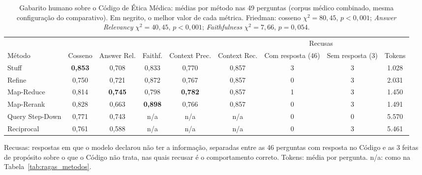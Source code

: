 \begin{table}[!t]
\centering
\footnotesize
\setlength{\tabcolsep}{4pt}
\caption{Gabarito humano sobre o Código de Ética Médica: médias por método nas 49 perguntas (corpus médico combinado, mesma configuração do comparativo). Em negrito, o melhor valor de cada métrica. Friedman: cosseno $\chi^2 = 80{,}45$, $p < 0{,}001$; \emph{Answer Relevancy} $\chi^2 = 40{,}45$, $p < 0{,}001$; \emph{Faithfulness} $\chi^2 = 7{,}66$, $p = 0{,}054$.}
\label{tab:gabarito_cfm}
\begin{tabular}{lcccccccc}
\toprule
& & & & & & \multicolumn{2}{c}{Recusas} & \\ \cmidrule(lr){7-8}
Método & Cosseno & Answer Rel. & Faithf. & Context Prec. & Context Rec. & Com resposta (46) & Sem resposta (3) & Tokens \\
\midrule
Stuff & \textbf{0,853} & 0,708 & 0,833 & 0,770 & 0,857 & 3 & 3 & 1.028 \\
Refine & 0,750 & 0,721 & 0,872 & 0,767 & 0,857 & 0 & 3 & 2.031 \\
Map-Reduce & 0,814 & \textbf{0,745} & 0,798 & \textbf{0,782} & 0,857 & 1 & 3 & 1.450 \\
Map-Rerank & 0,828 & 0,663 & \textbf{0,898} & 0,766 & 0,857 & 0 & 3 & 1.491 \\
Query Step-Down & 0,771 & 0,743 & n/a & n/a & n/a & 0 & 0 & 5.570 \\
Reciprocal & 0,761 & 0,588 & n/a & n/a & n/a & 0 & 3 & 5.461 \\
\bottomrule
\end{tabular}
\par\smallskip\parbox{0.95\linewidth}{\footnotesize Recusas: respostas em que o modelo declarou não ter a informação, separadas entre as 46 perguntas com resposta no Código e as 3 feitas de propósito sobre o que o Código não trata, nas quais recusar é o comportamento correto. Tokens: média por pergunta. n/a: como na Tabela~\ref{tab:ragas_metodos}.}
\end{table}
